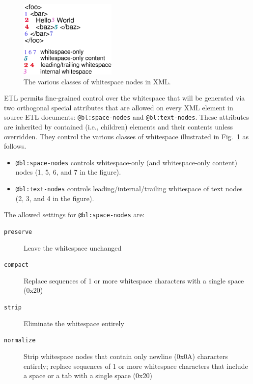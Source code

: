 \documentclass{www2003-submission}
\newcommand{\smtexttt}[1]{{\small\texttt{#1}}}
\newcommand{\figref}[1]{Fig.~\ref{fig-#1}}
\begin{document}
\begin{figure}[bt]
\begin{centering}
\includegraphics[height=1.5in]{etl-whitespace-rules.eps}
\caption{The various classes of whitespace nodes in XML. \label{fig-ws-rules}}
\end{centering}
\end{figure}

ETL permits fine-grained control over the whitespace that will be
generated via two orthogonal special attributes that are allowed on
every XML element in source ETL documents: \smtexttt{@bl:space-nodes}
and \smtexttt{@bl:text-nodes}.  These attributes are inherited by
contained (i.e., children) elements and their contents unless
overridden.  They control the various classes of whitespace
illustrated in \figref{ws-rules} as follows.

\begin{itemize}
\item \smtexttt{@bl:space-nodes} controls whitespace-only (and
      whitespace-only content) nodes (1, 5, 6, and 7 in the figure).
\item \smtexttt{@bl:text-nodes} controls leading/internal/trailing whitespace of
      text nodes (2, 3, and 4 in the figure).
\end{itemize}

The allowed settings for \smtexttt{@bl:space-nodes} are:

\begin{description}
  
\item[\smtexttt{preserve}] Leave the whitespace unchanged
      
\item[\smtexttt{compact}] Replace sequences of 1 or more
      whitespace characters with a single space (0x20)
      
\item[\smtexttt{strip}] Eliminate the whitespace entirely

\item[\smtexttt{normalize}] Strip whitespace nodes that contain only
newline (0x0A) characters entirely; replace sequences of 1 or more
whitespace characters that include a space or a tab with a single
space (0x20)

\end{description}
\end{document}
